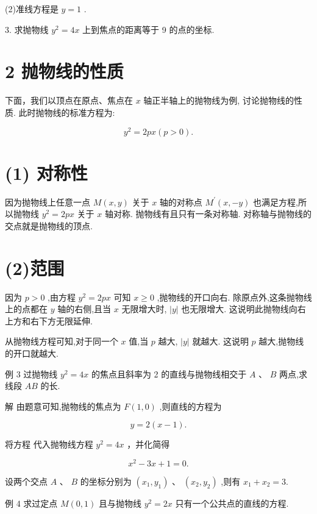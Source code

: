 \documentclass[10pt]{article}
\newcommand*\circled[1]{\tikz[baseline=(char.base)]{\node[shape=circle,draw,inner sep=1.5pt] (char) {\small #1};}}
\begin{document}
(2)准线方程是 \(y = 1\) .

3. 求抛物线 \({y}^{2} = {4x}\) 上到焦点的距离等于 9 的点的坐标.

\section*{2 抛物线的性质}

下面，我们以顶点在原点、焦点在 \(x\) 轴正半轴上的抛物线为例, 讨论抛物线的性质. 此时抛物线的标准方程为:

\[
{y}^{2} = {2px}\left( {p > 0}\right) .
\]

\section*{(1) 对称性}

因为抛物线上任意一点 \(M\left( {x,y}\right)\) 关于 \(x\) 轴的对称点 \({M}^{\prime }\left( {x, - y}\right)\) 也满足方程,所以抛物线 \({y}^{2} = {2px}\) 关于 \(x\) 轴对称. 抛物线有且只有一条对称轴. 对称轴与抛物线的交点就是抛物线的顶点.

\section*{(2)范围}

因为 \(p > 0\) ,由方程 \({y}^{2} = {2px}\) 可知 \(x \geq  0\) ,抛物线的开口向右. 除原点外,这条抛物线上的点都在 \(y\) 轴的右侧,且当 \(x\) 无限增大时, \(\left| y\right|\) 也无限增大. 这说明此抛物线向右上方和右下方无限延伸.

从抛物线方程可知,对于同一个 \(x\) 值,当 \(p\) 越大, \(\left| y\right|\) 就越大. 这说明 \(p\) 越大,抛物线的开口就越大.

例 3 过抛物线 \({y}^{2} = {4x}\) 的焦点且斜率为 2 的直线与抛物线相交于 \(A\text{ 、 }B\) 两点,求线段 \({AB}\) 的长.

解 由题意可知,抛物线的焦点为 \(F\left( {1,0}\right)\) ,则直线的方程为

\[
y = 2\left( {x - 1}\right) .
\]
  \circled{1} 

将方程 \circled{1} 代入抛物线方程 \({y}^{2} = {4x}\) ，并化简得

\[
{x}^{2} - {3x} + 1 = 0.
\]

设两个交点 \(A\text{ 、 }B\) 的坐标分别为 \(\left( {{x}_{1},{y}_{1}}\right) \text{ 、 }\left( {{x}_{2},{y}_{2}}\right)\) ,则有 \({x}_{1} + {x}_{2} = 3.\)

例 4 求过定点 \(M\left( {0,1}\right)\) 且与抛物线 \({y}^{2} = {2x}\) 只有一个公共点的直线的方程.
\end{document}
